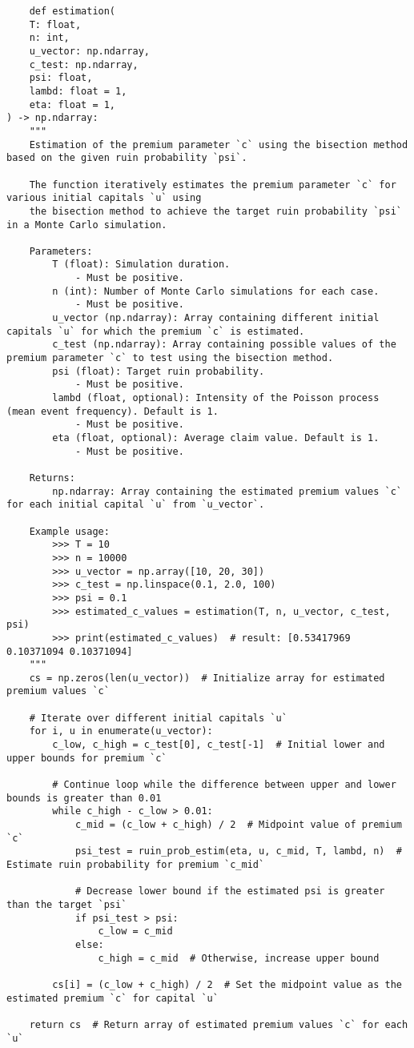 \documentclass[12pt,letterpaper]{article}
\theoremstyle{definition}
\begin{document}
\begin{lstlisting}
    def estimation(
    T: float,
    n: int,
    u_vector: np.ndarray,
    c_test: np.ndarray,
    psi: float,
    lambd: float = 1,
    eta: float = 1,
) -> np.ndarray:
    """
    Estimation of the premium parameter `c` using the bisection method based on the given ruin probability `psi`.

    The function iteratively estimates the premium parameter `c` for various initial capitals `u` using
    the bisection method to achieve the target ruin probability `psi` in a Monte Carlo simulation.

    Parameters:
        T (float): Simulation duration.
            - Must be positive.
        n (int): Number of Monte Carlo simulations for each case.
            - Must be positive.
        u_vector (np.ndarray): Array containing different initial capitals `u` for which the premium `c` is estimated.
        c_test (np.ndarray): Array containing possible values of the premium parameter `c` to test using the bisection method.
        psi (float): Target ruin probability.
            - Must be positive.
        lambd (float, optional): Intensity of the Poisson process (mean event frequency). Default is 1.
            - Must be positive.
        eta (float, optional): Average claim value. Default is 1.
            - Must be positive.

    Returns:
        np.ndarray: Array containing the estimated premium values `c` for each initial capital `u` from `u_vector`.

    Example usage:
        >>> T = 10
        >>> n = 10000
        >>> u_vector = np.array([10, 20, 30])
        >>> c_test = np.linspace(0.1, 2.0, 100)
        >>> psi = 0.1
        >>> estimated_c_values = estimation(T, n, u_vector, c_test, psi)
        >>> print(estimated_c_values)  # result: [0.53417969 0.10371094 0.10371094]
    """
    cs = np.zeros(len(u_vector))  # Initialize array for estimated premium values `c`

    # Iterate over different initial capitals `u`
    for i, u in enumerate(u_vector):
        c_low, c_high = c_test[0], c_test[-1]  # Initial lower and upper bounds for premium `c`

        # Continue loop while the difference between upper and lower bounds is greater than 0.01
        while c_high - c_low > 0.01:
            c_mid = (c_low + c_high) / 2  # Midpoint value of premium `c`
            psi_test = ruin_prob_estim(eta, u, c_mid, T, lambd, n)  # Estimate ruin probability for premium `c_mid`

            # Decrease lower bound if the estimated psi is greater than the target `psi`
            if psi_test > psi:
                c_low = c_mid
            else:
                c_high = c_mid  # Otherwise, increase upper bound

        cs[i] = (c_low + c_high) / 2  # Set the midpoint value as the estimated premium `c` for capital `u`

    return cs  # Return array of estimated premium values `c` for each `u`

\end{lstlisting}
\end{document}
